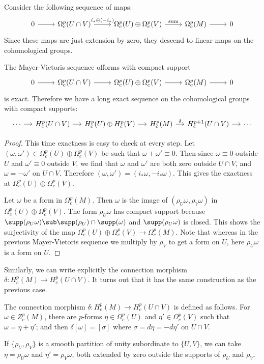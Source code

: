 Consider the following sequence of maps:
\[
\begin{tikzcd}
0\ar[r]&\Omega^p_c(U\cap V)\ar[r,"i_*\oplus(-i_*)"]&\Omega^p_c(U)\oplus\Omega^p_c(V)\ar[r,"\text{sum}"]&\Omega^p_c(M)\ar[r]&0
\end{tikzcd}\]
Since these maps are just extension by zero, they descend to linear maps on the cohomological groups.
\begin{proposition}
The Mayer-Vietoris sequence offorms with compact support
\[\begin{tikzcd}
0\ar[r]&\Omega^p_c(U\cap V)\ar[r]&\Omega^p_c(U)\oplus\Omega^p_c(V)\ar[r]&\Omega^p_c(M)\ar[r]&0
\end{tikzcd}\]
is exact. Therefore we have a long exact sequence on the cohomological groups with compact supports:
\[\begin{tikzcd}[column sep=small]
\cdots\ar[r]&H_c^p(U\cap V)\ar[r]&H^p_{c}(U)\oplus H^p_c(V)\ar[r]&H^p_c(M)\ar[r,"\delta"]&H^{p+1}_c(U\cap V)\ar[r]&\cdots
\end{tikzcd}\]
\end{proposition}
\begin{proof}
This time exactness is easy to check at every step. Let $(\omega,\omega')\in\Omega^p_c(U)\oplus\Omega^p_c(V)$ be such that $\omega+\omega'\equiv 0$. Then since 
$\omega\equiv 0$ outside $U$ and $\omega'\equiv 0$ outside $V$, we find that $\omega$ and $\omega'$ are both zero outside $U\cap V$, and $\omega=-\omega'$ on $U\cap V$. 
Therefore $(\omega,\omega')=(i_*\omega,-i_*\omega)$. This gives the exactness at $\Omega^p_c(U)\oplus\Omega^p_c(V)$.\par
Let $\omega$ be a form in $\Omega_c^p(M)$. Then $\omega$ is the image of $(\rho_U\omega,\rho_V\omega)$ in $\Omega^p_c(U)\oplus\Omega^p_c(V)$. The form $\rho_U\omega$ 
has compact support because $\supp(\rho_U\omega)\sub\supp(\rho_U)\cap\supp(\omega)$ and $\supp(\rho_U\omega)$ is closed. This shows the surjectivity of the map 
$\Omega^p_c(U)\oplus\Omega^p_c(V)\to\Omega^p_c(M)$. Note that whereas in the previous Mayer-Vietoris sequence we multiply by $\rho_V$ to get a form on $U$, here 
$\rho_U\omega$ is a form on $U$.
\end{proof}
Similarly, we can write explicitly the connection morphism $\delta:H^p_c(M)\to H^p_c(U\cap V)$. It turns out that it has the same construction as the previous case.
\begin{corollary}\label{Mayer-Vietoris de Rham compact connect}
The connection morphism $\delta:H^p_c(M)\to H^p_c(U\cap V)$ is defined as follows. For $\omega\in Z^p_c(M)$, there are $p$-forms $\eta\in\Omega^p_c(U)$ and 
$\eta'\in\Omega^p_c(V)$ such that $\omega=\eta+\eta'$; and then $\delta[\omega]=[\sigma]$ where $\sigma=d\eta=-d\eta'$ on $U\cap V$.\par
If $\{\rho_U,\rho_V\}$ is a smooth partition of unity subordinate to $\{U,V\}$, we can take $\eta=\rho_U\omega$ and $\eta'=\rho_V\omega$, both extended by zero outside 
the supports of $\rho_U$ and $\rho_V$.
\end{corollary}
